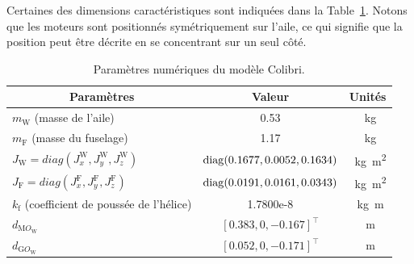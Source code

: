 Certaines des dimensions caractéristiques sont indiquées dans la Table~\ref{tab:pars_colibri}. Notons que les moteurs sont positionnés symétriquement sur l'aile, ce qui signifie que la position peut être décrite en se concentrant sur un seul côté. 

\begin{table}[ht]
  \centering
    \begin{tabular}{|l|c|c|}
      \hline
      \multicolumn{1}{|c|}{Paramètres} & Valeur & Unités  \\
      \hline
      $m_{\text{W}}$ (masse de l'aile)  & 0.53& \SI{}{\kilogram} \\
      \hline
      $m_{\text{F}}$ (masse du fuselage)  & 1.17& \SI{}{\kilogram} \\
      \hline
      $J_{\text{W}}=diag(J_{x}^{\text{W}}, J_{y}^{\text{W}}, J_{z}^{\text{W}})$ & \!\! $\operatorname{diag}(0.1677,0.0052,0.1634)$\!\! & \SI{}{\kilogram\square\meter}\\
      \hline
      $J_{\text{F}}=diag(J_{x}^{\text{F}}, J_{y}^{\text{F}}, J_{z}^{\text{F}})$ & \!\! $\operatorname{diag}(0.0191,0.0161,0.0343)$\!\! & \SI{}{\kilogram\square\meter}\\
      \hline
      $k_{\text{f}}$ (coefficient de poussée de l'hélice) & 1.7800e-8 & \SI{}{\kilogram\meter}\\
      \hline
       $d_{\text{M}O_{\text{W}}}$  & $[0.383,0,-0.167]^\top$ & \SI{}{\meter}\\
      \hline
       $d_{\text{G}O_{\text{W}}}$  & $[0.052,0,-0.171]^\top$ & \SI{}{\meter}\\
      \hline
    \end{tabular}
    \caption{Paramètres numériques du modèle Colibri.}
    \label{tab:pars_colibri}
\end{table}


